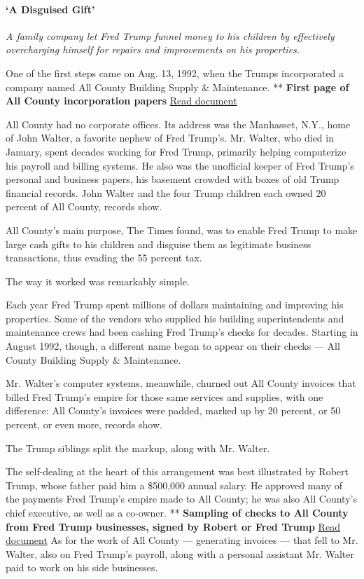 \hypertarget{a-disguised-gift}{%
\paragraph{`A Disguised Gift'}\label{a-disguised-gift}}

\emph{A family company let Fred Trump funnel money to his children by
effectively overcharging himself for repairs and improvements on his
properties.}

One of the first steps came on Aug. 13, 1992, when the Trumps
incorporated a company named All County Building Supply \& Maintenance.
** \textbf{First page of All County incorporation papers}
\href{https://int.nyt.com/data/documenthelper/129-all-county-inc/b4512827482c5ad9ea12/optimized/full.pdf\#page=1}{Read
document}

All County had no corporate offices. Its address was the Manhasset,
N.Y., home of John Walter, a favorite nephew of Fred Trump's. Mr.
Walter, who died in January, spent decades working for Fred Trump,
primarily helping computerize his payroll and billing systems. He also
was the unofficial keeper of Fred Trump's personal and business papers,
his basement crowded with boxes of old Trump financial records. John
Walter and the four Trump children each owned 20 percent of All County,
records show.

All County's main purpose, The Times found, was to enable Fred Trump to
make large cash gifts to his children and disguise them as legitimate
business transactions, thus evading the 55 percent tax.

The way it worked was remarkably simple.

Each year Fred Trump spent millions of dollars maintaining and improving
his properties. Some of the vendors who supplied his building
superintendents and maintenance crews had been cashing Fred Trump's
checks for decades. Starting in August 1992, though, a different name
began to appear on their checks --- All County Building Supply \&
Maintenance.

Mr. Walter's computer systems, meanwhile, churned out All County
invoices that billed Fred Trump's empire for those same services and
supplies, with one difference: All County's invoices were padded, marked
up by 20 percent, or 50 percent, or even more, records show.

The Trump siblings split the markup, along with Mr. Walter.

The self-dealing at the heart of this arrangement was best illustrated
by Robert Trump, whose father paid him a \$500,000 annual salary. He
approved many of the payments Fred Trump's empire made to All County; he
was also All County's chief executive, as well as a co-owner. **
\textbf{Sampling of checks to All County from Fred Trump businesses,
signed by Robert or Fred Trump}
\href{https://int.nyt.com/data/documenthelper/138-all-county-checks/76fe49efb6b1ae8eabe3/optimized/full.pdf\#page=1}{Read
document} As for the work of All County --- generating invoices --- that
fell to Mr. Walter, also on Fred Trump's payroll, along with a personal
assistant Mr. Walter paid to work on his side businesses.

